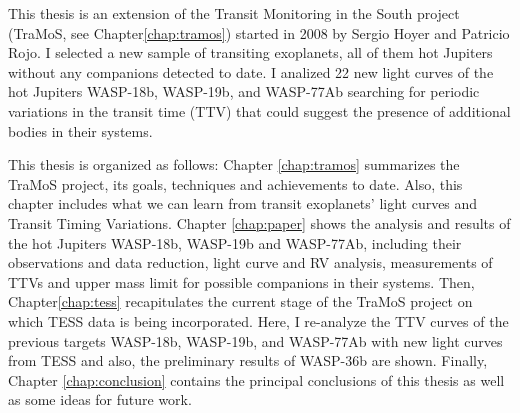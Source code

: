 This thesis is an extension of the Transit Monitoring in the South project (TraMoS, see Chapter\ref{chap:tramos}) started in 2008 by Sergio Hoyer and Patricio Rojo. I selected a new sample of transiting exoplanets, all of them hot Jupiters without any companions detected to date.  I analized 22 new light curves of the hot Jupiters WASP-18b, WASP-19b, and WASP-77Ab searching for periodic variations in the transit time (TTV) that could suggest the presence of additional bodies in their systems. 

This thesis is organized as follows: Chapter \ref{chap:tramos} summarizes the TraMoS project, its goals, techniques and achievements to date. Also, this chapter includes what we can learn from transit exoplanets' light curves and Transit Timing Variations. Chapter \ref{chap:paper} shows the analysis and results of the hot Jupiters WASP-18b, WASP-19b and WASP-77Ab, including  their observations and data reduction, light curve and RV analysis, measurements of TTVs and upper mass limit for possible companions in their systems. Then, Chapter\ref{chap:tess}  recapitulates the current stage of the TraMoS project on which TESS data is being incorporated. Here, I re-analyze the TTV curves of the previous targets WASP-18b, WASP-19b, and WASP-77Ab with new light curves from TESS and also, the preliminary results of WASP-36b are shown. Finally, Chapter \ref{chap:conclusion} contains the principal conclusions of this thesis as well as some ideas for future work. 


